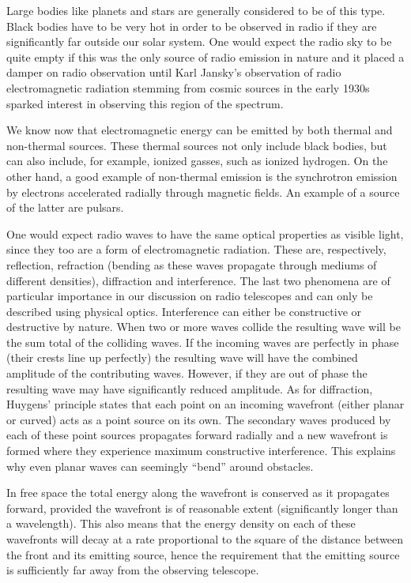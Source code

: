 Large bodies like planets and stars are generally considered to be of this type. Black bodies have to be very hot 
in order to be observed in radio if they are significantly far outside our solar system. One would expect the radio sky to be
quite empty if this was the only source of radio emission in nature and it placed a damper on radio observation until 
Karl Jansky's observation of radio electromagnetic radiation stemming from cosmic sources in the early 1930s sparked interest in observing 
this region of the spectrum. 

We know now that electromagnetic energy can be emitted by both thermal and non-thermal sources. These thermal sources not only include
black bodies, but can also include, for example, ionized gasses, such as ionized hydrogen. On the other hand, a good example of 
non-thermal emission is the synchrotron emission by electrons accelerated radially through magnetic fields. 
An example of a source of the latter are pulsars. 

One would expect radio waves to have the same optical properties as visible light, since they too are a form of electromagnetic radiation. These are, respectively, reflection, refraction (bending as these waves propagate
through mediums of different densities), diffraction and interference. The last two phenomena are of particular importance in our discussion on radio telescopes and can only be described using
physical optics. Interference can either be constructive or destructive by nature. When two or more waves collide the resulting wave will be the sum total of the colliding waves. If the incoming waves are perfectly 
in phase (their crests line up perfectly) the resulting wave will have the combined amplitude of the contributing waves. However, if they are out of phase the resulting wave may have significantly reduced amplitude. 
As for diffraction, Huygens' principle states that each point on an incoming wavefront (either planar or curved) acts as a point source on its own. The secondary waves produced by each of these point sources 
propagates forward radially and a new wavefront is formed where they experience maximum constructive interference. This explains why even planar waves can seemingly ``bend'' around obstacles.

In free space the total energy along the wavefront is conserved as it propagates forward, provided 
the wavefront is of reasonable extent (significantly longer than a wavelength). This also means that the energy density 
on each of these wavefronts will decay at a rate proportional to the square of the distance between the front and its emitting source, hence
the requirement that the emitting source is sufficiently far away from the observing telescope. 

